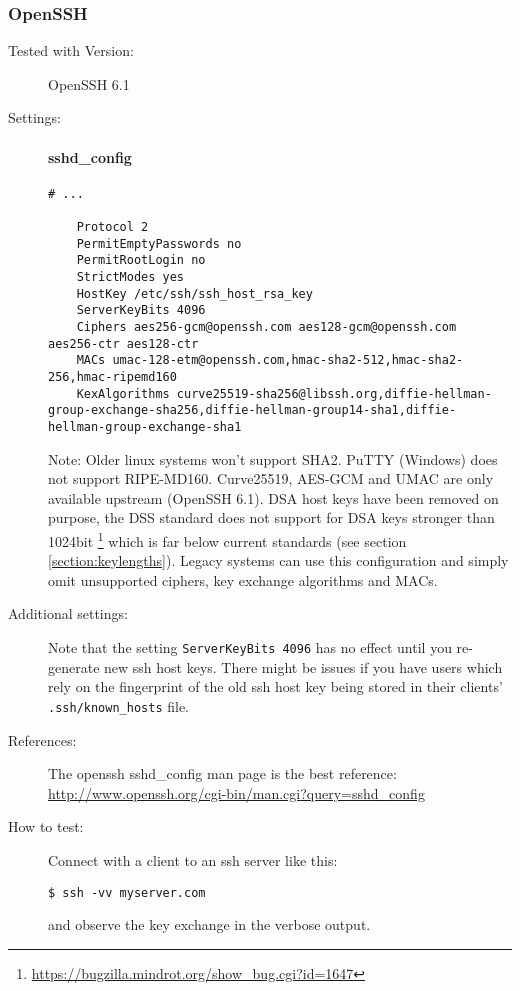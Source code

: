 \subsubsection{OpenSSH}


\begin{description}
\item[Tested with Version:] OpenSSH 6.1

\item[Settings:] \mbox{}


\paragraph*{sshd_config}
\begin{lstlisting}[breaklines]
	# ...

	Protocol 2
	PermitEmptyPasswords no
	PermitRootLogin no
	StrictModes yes
	HostKey /etc/ssh/ssh_host_rsa_key
	ServerKeyBits 4096
	Ciphers aes256-gcm@openssh.com aes128-gcm@openssh.com aes256-ctr aes128-ctr
	MACs umac-128-etm@openssh.com,hmac-sha2-512,hmac-sha2-256,hmac-ripemd160
	KexAlgorithms curve25519-sha256@libssh.org,diffie-hellman-group-exchange-sha256,diffie-hellman-group14-sha1,diffie-hellman-group-exchange-sha1
\end{lstlisting}


Note: Older linux systems won't support SHA2. PuTTY (Windows) does not support
RIPE-MD160. Curve25519, AES-GCM and UMAC are only available upstream (OpenSSH
6.1). DSA host keys have been removed on purpose, the DSS standard does not
support for DSA keys stronger than 1024bit
\footnote{\url{https://bugzilla.mindrot.org/show_bug.cgi?id=1647}} which is far
below current standards (see section \ref{section:keylengths}). Legacy systems
can use this configuration and simply omit unsupported ciphers, key exchange
algorithms and MACs.  

\item[Additional settings:] \mbox{}

Note that the setting \texttt{ServerKeyBits 4096}  has no effect until you re-generate new ssh host keys. There might be issues if you have users which rely on the fingerprint of the old ssh host key being stored in their clients' \texttt{.ssh/known\_hosts} file.

\item[References:] The openssh sshd\_config  man page is the best reference: \url{http://www.openssh.org/cgi-bin/man.cgi?query=sshd_config}


\item[How to test:]

Connect with a client to an ssh server like this: \\
\begin{lstlisting}[breaklines]
$ ssh -vv myserver.com
\end{lstlisting}
and observe the key exchange in the verbose output.

\end{description}
